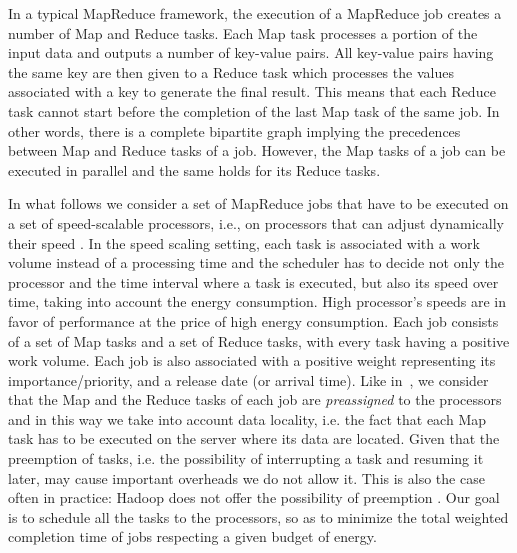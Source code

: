 \documentclass{llncs}
\begin{document}
In a typical MapReduce framework, the execution of a MapReduce job creates a number of Map and Reduce tasks.
Each Map task processes a portion of the input data and outputs a number of key-value pairs.
All key-value pairs having the same key are then given to a Reduce task which processes the values associated with a key to generate the final result.
This means that each Reduce task cannot start before the completion of the last Map task of the same job.
In other words, there is a complete bipartite graph implying the precedences between Map and Reduce tasks of a job.
However, the Map tasks of a job can be executed in parallel and the same holds for its Reduce tasks.

In what follows we consider a set of MapReduce jobs that have to be  executed on a set of speed-scalable processors,
i.e., on processors that can adjust dynamically their speed \cite{YaoDS95}.
In the speed scaling setting, each task is associated with a work volume instead of a processing time
and the scheduler  has to decide not only the processor and the time interval where a task is executed,
but also its speed over time, taking into account the energy consumption.
High processor's speeds are in favor of performance  at the price of high energy consumption.
Each job consists of a set of Map tasks and a set of Reduce tasks, with every task having a positive work volume.
Each job is also associated with a positive weight representing its importance/priority, and a release date (or arrival time).
Like in~\cite{ChangKKLLM11,ChenKL12}, we consider that the Map and the Reduce tasks of each job are \emph{preassigned} to the processors and in this way we take into account data locality, i.e. the fact that each Map task has to be executed on the server where
its data are located. Given that  the preemption of tasks, i.e. the possibility of interrupting a task and resuming it later, may cause important overheads we do not allow it. This is also the case often in practice: Hadoop does not offer the possibility of preemption \cite{MoseleyDKS11}.
Our goal is to schedule all the tasks to the processors,
so as to minimize the total weighted completion time of jobs respecting a given budget of energy.
\end{document}
